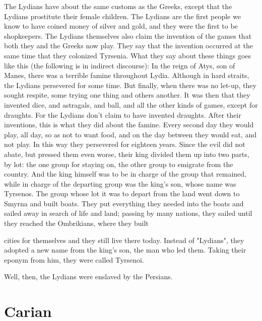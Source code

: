 \begin{latexquotation}
The Lydians have about the same customs as the Greeks, except that the
Lydians prostitute their female children. The Lydians are the first people
we know to have coined money of silver and gold, and they were the first to
be shopkeepers. The Lydians themselves also claim the invention of the
games that both they and the Greeks now play. They say that the invention
occurred at the same time that they colonized Tyrsenia. What they say
about these things goes like this (the following is in indirect discourse):
In the reign of Atys, son of Manes, there was a terrible famine
throughout Lydia. Although in hard straits, the Lydians persevered for
some time. But finally, when there was no let-up, they sought respite,
some trying one thing and others another. It was then that they invented
dice, and astragals, and ball, and all the other kinds of games, except for
draughts. For the Lydians don't claim to have invented draughts. After
their inventions, this is what they did about the famine. Every second
day they would play, all day, so as not to want food, and on the day
between they would eat, and not play. In this way they persevered for
eighteen years. Since the evil did not abate, but pressed them even
worse, their king divided them up into two parts, by lot: the one group
for staying on, the other group to emigrate from the country. And the
king himself was to be in charge of the group that remained, while in
charge of the departing group was the king's son, whose name was
Tyrsenos. The group whose lot it was to depart from the land went down
to Smyrna and built boats. They put everything they needed into the
boats and sailed away in search of life and land; passing by many
nations, they sailed until they reached the Ombrikians, where they built

cities for themselves and they still live there today. Instead of "Lydians",
they adopted a new name from the king's son, the man who led them.
Taking their eponym from him, they were called Tyrsenoi.

Well, then, the Lydians were enslaved by the Persians.
\end{latexquotation}



\section{Carian}


